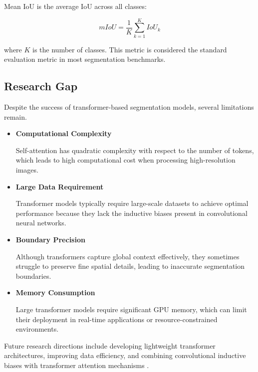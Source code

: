 Mean IoU is the average IoU across all classes:

\begin{equation}
mIoU = \frac{1}{K}\sum_{k=1}^{K} IoU_k
\end{equation}

where $K$ is the number of classes. 
This metric is considered the standard evaluation metric in most segmentation benchmarks.

\subsection{Research Gap}

Despite the success of transformer-based segmentation models, several limitations remain.

\begin{itemize}

\item \textbf{Computational Complexity}

Self-attention has quadratic complexity with respect to the number of tokens, which leads to high computational cost when processing high-resolution images.

\item \textbf{Large Data Requirement}

Transformer models typically require large-scale datasets to achieve optimal performance because they lack the inductive biases present in convolutional neural networks.

\item \textbf{Boundary Precision}

Although transformers capture global context effectively, they sometimes struggle to preserve fine spatial details, leading to inaccurate segmentation boundaries.

\item \textbf{Memory Consumption}

Large transformer models require significant GPU memory, which can limit their deployment in real-time applications or resource-constrained environments.

\end{itemize}

Future research directions include developing lightweight transformer architectures, improving data efficiency, and combining convolutional inductive biases with transformer attention mechanisms \cite{xie2021segformer,liu2021swin}.
